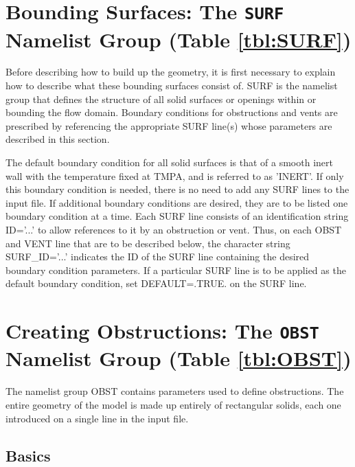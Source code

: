 \documentclass[11pt]{book}
\begin{document}
\section{Bounding Surfaces: The \texorpdfstring{{\tt SURF}}{SURF} Namelist Group (Table \ref{tbl:SURF})}
\label{info:SURF}

Before describing how to build up the geometry, it is first necessary to explain how to describe what these bounding surfaces
consist of. {\ct SURF} is the namelist group that defines
the structure of all solid surfaces or openings within or
bounding the flow domain. Boundary conditions for obstructions and vents are
prescribed by referencing the appropriate {\ct SURF} line(s) whose
parameters are described in this section.

The default boundary condition for all solid surfaces is that of a smooth
inert wall with the temperature fixed at {\ct TMPA}, and is referred to as {\ct 'INERT'}. If only this
boundary condition is needed, there is no need to add any {\ct SURF} lines
to the input file. If additional boundary conditions are desired,
they are to be listed one boundary condition at a time.
Each {\ct SURF} line consists of an identification string {\ct ID='...'} to
allow references to it by an obstruction or vent. Thus, on each
{\ct OBST} and {\ct VENT} line that are to be described below, the character string {\ct SURF\_ID='...'}
indicates the {\ct ID} of the {\ct SURF} line containing the desired boundary
condition parameters. If a particular {\ct SURF} line is to be applied
as the default boundary condition,
set {\ct DEFAULT=.TRUE.} on the {\ct SURF} line.




\section{Creating Obstructions: The \texorpdfstring{{\tt OBST}}{OBST} Namelist Group (Table \ref{tbl:OBST})}
\label{info:OBST}

The namelist group {\ct OBST} contains parameters used to define obstructions. The entire geometry of the model is made up entirely of rectangular solids, each one introduced on a single line in the input file.

\subsection{Basics}
\label{info:OBST_Basics}
\end{document}
